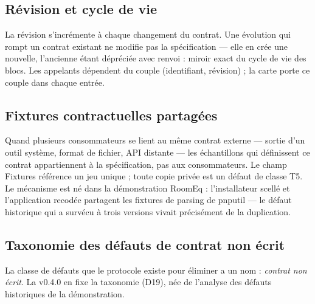 \subsection{Révision et cycle de vie}

La révision s’incrémente à chaque changement du contrat. Une évolution qui rompt un
contrat existant ne modifie pas la spécification — elle en crée une nouvelle, l’ancienne
étant dépréciée avec renvoi : miroir exact du cycle de vie des blocs. Les appelants
dépendent du couple (identifiant, révision) ; la carte porte ce couple dans chaque entrée.

\subsection{Fixtures contractuelles partagées}

Quand plusieurs consommateurs se lient au même contrat externe — sortie d’un outil
système, format de fichier, API distante — les échantillons qui définissent ce contrat
appartiennent à la spécification, pas aux consommateurs. Le champ Fixtures référence un
jeu unique ; toute copie privée est un défaut de classe T5. Le mécanisme est né dans la
démonstration RoomEq : l’installateur scellé et l’application recodée partagent les
fixtures de parsing de pnputil — le défaut historique qui a survécu à trois versions
vivait précisément de la duplication.

\subsection{Taxonomie des défauts de contrat non écrit}\label{sec:taxonomie}

La classe de défauts que le protocole existe pour éliminer a un nom : \emph{contrat non
écrit}. La v0.4.0 en fixe la taxonomie (D19), née de l’analyse des défauts historiques de
la démonstration.


